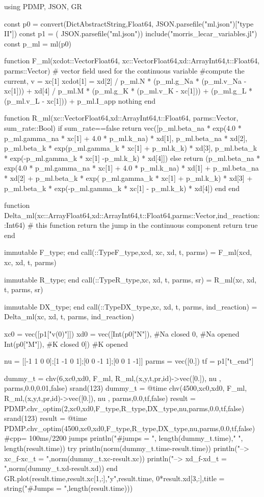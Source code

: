 \documentclass[article]{jss}
\begin{document}
\begin{Code}
using PDMP, JSON, GR

const p0  = convert(Dict{AbstractString,Float64}, JSON.parsefile("ml.json")["type II"])
const p1  = ( JSON.parsefile("ml.json"))
include("morris_lecar_variables.jl")
const p_ml = ml(p0)

function F_ml(xcdot::Vector{Float64}, xc::Vector{Float64},xd::Array{Int64},t::Float64, parms::Vector)
  # vector field used for the continuous variable
  #compute the current, v = xc[1]
  xcdot[1] = xd[2] / p_ml.N * (p_ml.g_Na * (p_ml.v_Na - xc[1])) + 
    xd[4] / p_ml.M * (p_ml.g_K  * (p_ml.v_K  - xc[1]))  +
    (p_ml.g_L  * (p_ml.v_L  - xc[1])) + p_ml.I_app
  nothing
end

function R_ml(xc::Vector{Float64},xd::Array{Int64},t::Float64, parms::Vector, sum_rate::Bool)
  if sum_rate==false
    return vec([p_ml.beta_na * exp(4.0 * p_ml.gamma_na * xc[1] + 4.0 * p_ml.k_na) * xd[1],
                p_ml.beta_na * xd[2],
                p_ml.beta_k * exp(p_ml.gamma_k * xc[1] + p_ml.k_k) * xd[3],
                p_ml.beta_k * exp(-p_ml.gamma_k * xc[1]  -p_ml.k_k) * xd[4]])
  else
    return (p_ml.beta_na * exp(4.0 * p_ml.gamma_na * xc[1] + 4.0 * p_ml.k_na) * xd[1] +
              p_ml.beta_na * xd[2] +
              p_ml.beta_k * exp( p_ml.gamma_k * xc[1] + p_ml.k_k) * xd[3] +
              p_ml.beta_k * exp(-p_ml.gamma_k * xc[1] - p_ml.k_k) * xd[4])
  end
end

function Delta_ml(xc::Array{Float64},xd::Array{Int64},t::Float64,parms::Vector,ind_reaction::Int64)
  # this function return the jump in the continuous component
  return true
end

immutable F_type; end
call(::Type{F_type},xcd, xc, xd, t, parms) = F_ml(xcd, xc, xd, t, parms)

immutable R_type; end
call(::Type{R_type},xc, xd, t, parms, sr) = R_ml(xc, xd, t, parms, sr)

immutable DX_type; end
call(::Type{DX_type},xc, xd, t, parms, ind_reaction) = Delta_ml(xc, xd, t, parms, ind_reaction)

xc0 = vec([p1["v(0)"]])
xd0 = vec([Int(p0["N"]),    #Na closed
           0,               #Na opened
           Int(p0["M"]),    #K closed
           0])              #K opened

nu = [[-1 1 0 0];[1 -1 0 1];[0 0 -1 1];[0 0 1 -1]]
parms = vec([0.])
tf = p1["t_end"]

dummy_t = chv(6,xc0,xd0, F_ml, R_ml,(x,y,t,pr,id)->vec([0.]), nu , parms,0.0,0.01,false)
srand(123)
dummy_t = @time chv(4500,xc0,xd0, F_ml, R_ml,(x,y,t,pr,id)->vec([0.]), nu , parms,0.0,tf,false)
result =  PDMP.chv_optim(2,xc0,xd0,F_type,R_type,DX_type,nu,parms,0.0,tf,false)
srand(123)
result =  @time PDMP.chv_optim(4500,xc0,xd0,F_type,R_type,DX_type,nu,parms,0.0,tf,false) #cpp= 100ms/2200 jumps
println("#jumps = ", length(dummy_t.time)," ", length(result.time))
try
  println(norm(dummy_t.time-result.time))
  println("--> xc_f-xc_t = ",norm(dummy_t.xc-result.xc))
  println("--> xd_f-xd_t = ",norm(dummy_t.xd-result.xd))
end
GR.plot(result.time,result.xc[1,:],"y",result.time, 0*result.xd[3,:],title = string("#Jumps = ",length(result.time)))
\end{Code}
\end{document}
